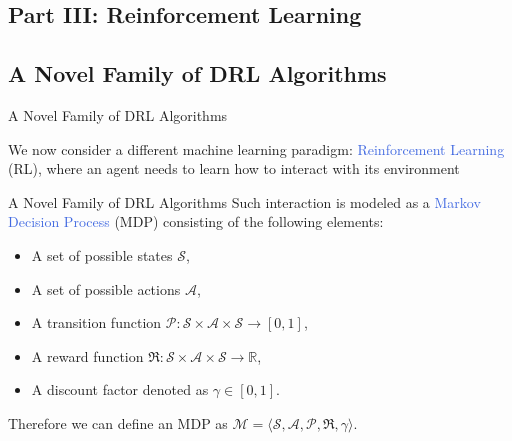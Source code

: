 \documentclass{beamer}
\begin{document}


\begin{frame}
	\section{Part III: Reinforcement Learning}	
		\tableofcontents[sectionstyle=show/hide,subsectionstyle=show/show/hide]	
	\subsection{A Novel Family of DRL Algorithms}
\end{frame}

\begin{frame}{A Novel Family of DRL Algorithms}

	\bigskip
	We now consider a different machine learning paradigm: \textcolor{RoyalBlue}{Reinforcement Learning} (RL), where an agent needs to learn how to interact with its environment

	\begin{figure}[htb!]
		\centering
		
 		\label{fig:rl_loop}
	\end{figure}

\end{frame}

\begin{frame}{A Novel Family of DRL Algorithms}
	Such interaction is modeled as a \textcolor{RoyalBlue}{Markov Decision Process} (MDP) consisting of the following elements:

\begin{itemize}
	\item A set of possible states $\mathcal{S}$,
	\item A set of possible actions $\mathcal{A}$,
	\item A transition function $\mathcal{P}:\mathcal{S}\times\mathcal{A}\times\mathcal{S}\rightarrow [0,1]$,
	\item A reward function $\Re:\mathcal{S}\times\mathcal{A}\times\mathcal{S}\rightarrow \mathbb{R}$,
	\item A discount factor denoted as $\gamma \in [0,1]$.
\end{itemize}

\bigskip

Therefore we can define an MDP as $\mathcal{M}=\langle\mathcal{S}, \mathcal{A}, \mathcal{P}, \Re, \gamma\rangle$.

\end{frame}
\end{document}

